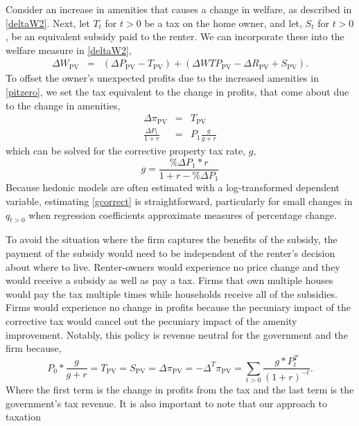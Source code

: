 \documentclass[ecta,nameyear,draft]{econsocart}
\theoremstyle{plain}
\theoremstyle{remark}
\begin{document}
Consider an increase in amenities that causes a change in welfare, as described in \ref{deltaW2}. Next, let $T_t$ for $t>0$ be a tax on the home owner, and let, $S_t$ for $t>0$, be an equivalent subsidy paid to the renter. We can incorporate these into the welfare measure in \ref{deltaW2},
\begin{eqnarray*}
	\Delta W_{\mathrm{PV}}&=& \left(\Delta P_{\mathrm{PV}}-T_{\mathrm{PV}}\right)+\left(\Delta\mathit{WTP}_\mathrm{PV}-\Delta R_{\mathrm{PV}}+S_{\mathrm{PV}}\right).\nonumber
\end{eqnarray*}
To offset the owner's unexpected profits due to the increased amenities in \ref{pitzero}, we set the tax equivalent to the change in profits, that come about due to the change in amenities,
\begin{eqnarray*}
 \Delta \pi_{\mathrm{PV}}&=&T_{\mathrm{PV}}\\
\frac{\Delta P_1}{1+r}&=&P_1\frac{g}{g+r}
\end{eqnarray*}
which can be solved for the corrective property tax rate, $g$,
\begin{equation}
	g=\frac{\% \Delta P_1*r}{1+r-\% \Delta P_1} \label{gcorrect}
\end{equation}
Because hedonic models are often estimated with a log-transformed dependent variable, estimating \ref{gcorrect} is straightforward, particularly for small changes in $q_{t>0}$ when regression coefficients approximate measures of percentage change. 

To avoid the situation where the firm captures the benefits of the subsidy, the payment of the subsidy would need to be independent of the renter's decision about where to live. Renter-owners would experience no price change and they would receive a subsidy as well as pay a tax. Firms that own multiple houses would pay the tax multiple times while households receive all of the subsidies. Firms would experience no change in profits because the pecuniary impact of the corrective tax would cancel out the pecuniary impact of the amenity improvement.
Notably, this policy is revenue neutral for the government and the firm because, 
\begin{equation*}
	P_0*\frac{g}{g+r}=T_{\mathrm{PV}}=S_{\mathrm{PV}}=\Delta \pi_{\mathrm{PV}}=-\Delta^T \pi_{\mathrm{PV}}=\sum_{t>0}\frac{g*P_t^T}{(1+r)^{-t}}.
\end{equation*}
Where the first term is the change in profits from the tax and the last term is the government's tax revenue. 
It is also important to note that our approach to taxation
\end{document}
